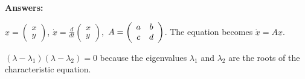 \documentclass[12pt,letterpaper,noanswers]{exam}
\begin{document}
\eject



\eject 
\textbf{Answers:}
\begin{questions}
    \item \begin{parts}
    \item $\displaystyle \underline{x} = \left(\begin{array}{c} x \\ y \end{array}\right)$, $\displaystyle \dot{\underline{x}} = \frac{d}{dt}\left(\begin{array}{c} x \\ y \end{array}\right),$ $A = \left(\begin{array}{c c} a & b \\ c & d \end{array}\right)$.  The equation becomes $\dot{\underline{x}} = A\underline{x}$.
    \item  $(\lambda - \lambda_1)(\lambda - \lambda_2) = 0$ because the eigenvalues $\lambda_1$ and $\lambda_2$ are the roots of the characteristic equation.


\end{parts}
\end{questions}
\end{document}
